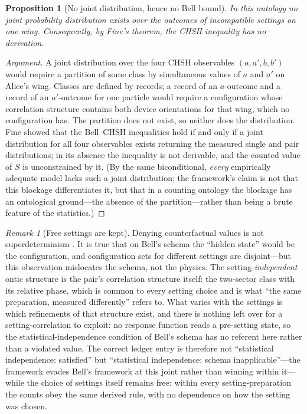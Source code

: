\documentclass[11pt]{article}
\newtheorem{proposition}{Proposition}
\theoremstyle{definition}
\theoremstyle{remark}
\newtheorem{remark}{Remark}
\begin{document}
\begin{proposition}[No joint distribution, hence no Bell bound]\label{prop:fine}
In this ontology no joint probability distribution exists over the outcomes of incompatible settings on one wing. Consequently, by Fine's theorem, the CHSH inequality has no derivation.
\end{proposition}
\begin{proof}[Argument]
A joint distribution over the four CHSH observables $(a, a', b, b')$ would require a partition of some class by simultaneous values of $a$ and $a'$ on Alice's wing. Classes are defined by records; a record of an $a$-outcome and a record of an $a'$-outcome for one particle would require a configuration whose correlation structure contains both device orientations for that wing, which no configuration has. The partition does not exist, so neither does the distribution. Fine \cite{Fine1982} showed that the Bell--CHSH inequalities hold if and only if a joint distribution for all four observables exists returning the measured single and pair distributions; in its absence the inequality is not derivable, and the counted value of $S$ is unconstrained by it. (By the same biconditional, \emph{every} empirically adequate model lacks such a joint distribution; the framework's claim is not that this blockage differentiates it, but that in a counting ontology the blockage has an ontological ground---the absence of the partition---rather than being a brute feature of the statistics.)
\end{proof}

\begin{remark}[Free settings are kept]\label{rem:free}
Denying counterfactual values is not superdeterminism \cite{tHooft2016}. It is true that on Bell's schema the ``hidden state'' would be the configuration, and configuration sets for different settings are disjoint---but this observation mislocates the schema, not the physics. The setting-\emph{independent} ontic structure is the pair's correlation structure itself: the two-sector class with its relative phase, which is common to every setting choice and is what ``the same preparation, measured differently'' refers to. What varies with the settings is which refinements of that structure exist, and there is nothing left over for a setting-correlation to exploit: no response function reads a pre-setting state, so the statistical-independence condition of Bell's schema has no referent here rather than a violated value. The correct ledger entry is therefore not ``statistical independence: satisfied'' but ``statistical independence: schema inapplicable''---the framework evades Bell's framework at this joint rather than winning within it---while the choice of settings itself remains free: within every setting-preparation the counts obey the same derived rule, with no dependence on how the setting was chosen.
\end{remark}
\end{document}
